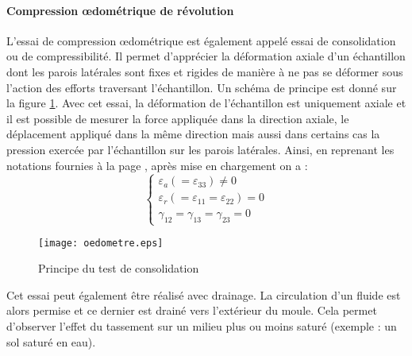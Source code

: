 			\paragraph{Compression \oe{}dométrique de révolution\\}
				L'essai de compression \oe{}dométrique est également appelé essai de consolidation ou de compressibilité. Il permet d'apprécier la déformation axiale d'un échantillon dont les parois latérales sont fixes et rigides de manière à ne pas se déformer sous l'action des efforts traversant l'échantillon. Un schéma de principe est donné sur la figure \ref{fig03:oedometre}. Avec cet essai, la déformation de l'échantillon est uniquement axiale et il est possible de mesurer la force appliquée dans la direction axiale, le déplacement appliqué dans la même direction mais aussi dans certains cas la pression exercée par l'échantillon sur les parois latérales. Ainsi, en reprenant les notations fournies à la page \pageref{keywords}, après mise en chargement on a :
				\begin{equation}\label{eq03:defo_oedometre}
					\left\{\begin{array}{l}
						\varepsilon_a (= \varepsilon_{33}) \neq 0\\
						\varepsilon_r (= \varepsilon_{11} = \varepsilon_{22}) = 0\\
						\gamma_{12} = \gamma_{13} = \gamma_{23} = 0
					\end{array}\right.
				\end{equation}
				\begin{figure}\centering
					\texttt{[image: oedometre.eps]}
					\caption{\label{fig03:oedometre}Principe du test de consolidation}
				\end{figure}
				Cet essai peut également être réalisé avec drainage. La circulation d'un fluide est alors permise et ce dernier est drainé vers l'extérieur du moule. Cela permet d'observer l'effet du tassement sur un milieu plus ou moins saturé (exemple : un sol saturé en eau).

